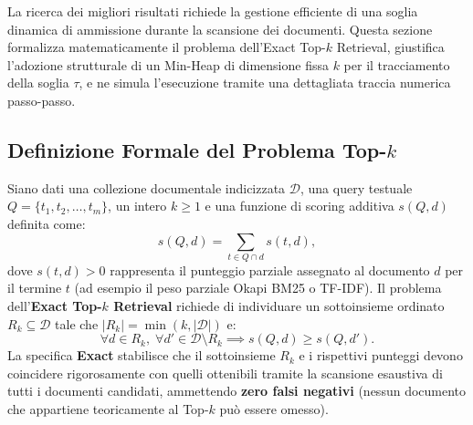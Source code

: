 La ricerca dei migliori risultati richiede la gestione efficiente di una soglia dinamica di ammissione durante la scansione dei documenti. Questa sezione formalizza matematicamente il problema dell'Exact Top-$k$ Retrieval, giustifica l'adozione strutturale di un Min-Heap di dimensione fissa $k$ per il tracciamento della soglia $\tau$, e ne simula l'esecuzione tramite una dettagliata traccia numerica passo-passo.

\FloatBarrier
\subsection{Definizione Formale del Problema Top-$k$}
\label{subsec:definizione-formale-topk}
\begin{definition}
Siano dati una collezione documentale indicizzata $\mathcal{D}$, una query testuale $Q = \{t_1, t_2, \dots, t_m\}$, un intero $k \ge 1$ e una funzione di scoring additiva $s(Q, d)$ definita come:
\begin{equation}
    s(Q, d) = \sum_{t \in Q \cap d} s(t, d),
    \label{eq:score-additivo}
\end{equation}
dove $s(t, d) > 0$ rappresenta il punteggio parziale assegnato al documento $d$ per il termine $t$ (ad esempio il peso parziale Okapi BM25 o TF-IDF).  
Il problema dell'\textbf{Exact Top-$k$ Retrieval} richiede di individuare un sottoinsieme ordinato $R_k \subseteq \mathcal{D}$ tale che $|R_k| = \min(k, |\mathcal{D}|)$ e:
\begin{equation}
    \forall d \in R_k, \; \forall d' \in \mathcal{D} \setminus R_k \implies s(Q, d) \ge s(Q, d').
    \label{eq:exact-topk-condition}
\end{equation}
La specifica \textbf{Exact} stabilisce che il sottoinsieme $R_k$ e i rispettivi punteggi devono coincidere rigorosamente con quelli ottenibili tramite la scansione esaustiva di tutti i documenti candidati, ammettendo \textbf{zero falsi negativi} (nessun documento che appartiene teoricamente al Top-$k$ pu\`o essere omesso).
\end{definition}

\FloatBarrier
